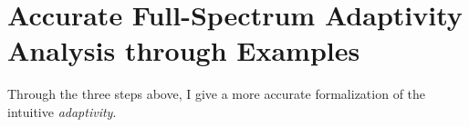 
\section{Accurate Full-Spectrum Adaptivity Analysis through Examples}
\label{sec:improved-examples}
Through the three steps above, I give a more accurate formalization of the intuitive \emph{adaptivity}.

